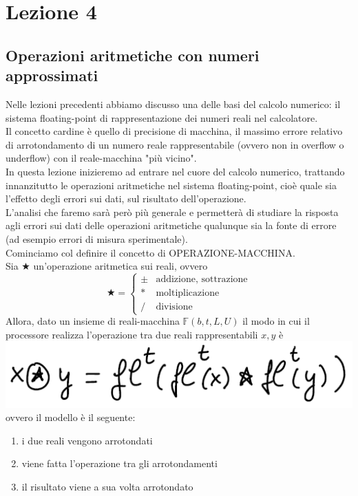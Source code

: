 \documentclass[12pt]{article}
\begin{document}
\section*{Lezione 4}
\subsection*{Operazioni aritmetiche con numeri approssimati}
Nelle lezioni precedenti abbiamo discusso una delle basi del calcolo numerico: il sistema floating-point di rappresentazione dei numeri reali nel calcolatore. \\
Il concetto cardine è quello di precisione di macchina, il massimo errore relativo di arrotondamento di un numero reale rappresentabile (ovvero non in overflow o underflow) con il reale-macchina "più vicino".\\
In questa lezione inizieremo ad entrare nel cuore del calcolo numerico, trattando innanzitutto le operazioni aritmetiche nel sistema floating-point, cioè quale sia l’effetto degli errori sui dati, sul risultato dell'operazione.\\
L'analisi che faremo sarà però più generale e permetterà di studiare la risposta agli errori sui dati delle operazioni aritmetiche qualunque sia la fonte di errore (ad esempio errori di misura sperimentale).\\
Cominciamo col definire il concetto di OPERAZIONE-MACCHINA.\\
Sia $\bigstar$ un’operazione aritmetica sui reali, ovvero \[ \bigstar =
\begin{cases}
    \pm & \text{addizione, sottrazione} \\
    * & \text{moltiplicazione} \\
    / & \text{divisione}
\end{cases}
\]
Allora, dato un insieme di reali-macchina $\mathbb{F}(b, t, L, U)$ il modo in cui il processore realizza l’operazione tra due reali rappresentabili $x, y$ è \newline
\includegraphics[width=\linewidth]{img11}
ovvero il modello è il seguente:
\begin{enumerate}
    \item i due reali vengono arrotondati
    \item viene fatta l’operazione tra gli arrotondamenti
    \item il risultato viene a sua volta arrotondato
\end{enumerate}
\end{document}
